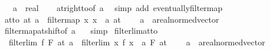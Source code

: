 \begin{isabellebody}
\ \ \ a\ {\isacharcolon}{\kern0pt}{\isacharcolon}{\kern0pt}\ real\isanewline
%
\isadelimproof
\ \ %
\endisadelimproof
%
\isatagproof
{}\isamarkupfalse%
\ at{\isacharunderscore}{\kern0pt}right{\isacharunderscore}{\kern0pt}to{\isacharunderscore}{\kern0pt}{}{\isacharbrackleft}{\kern0pt}of\ a{\isacharbrackright}{\kern0pt}\ \isamarkupfalse%
\ {\isacharparenleft}{\kern0pt}simp\ add{\isacharcolon}{\kern0pt}\ eventually{\isacharunderscore}{\kern0pt}filtermap{\isacharparenright}{\kern0pt}%
\endisatagproof
{\isafoldproof}%
%
\isadelimproof
\isanewline
%
\endisadelimproof
\isanewline
{}\isamarkupfalse%
\ at{\isacharunderscore}{\kern0pt}to{\isacharunderscore}{\kern0pt}{}{\isacharcolon}{\kern0pt}\ {\isachardoublequoteopen}at\ a\ {\isacharequal}{\kern0pt}\ filtermap\ {\isacharparenleft}{\kern0pt}{\isasymlambda}x{\isachardot}{\kern0pt}\ x\ {\isacharplus}{\kern0pt}\ a{\isacharparenright}{\kern0pt}\ {\isacharparenleft}{\kern0pt}at\ {}{\isacharparenright}{\kern0pt}{\isachardoublequoteclose}\isanewline
\ \ \ a\ {\isacharcolon}{\kern0pt}{\isacharcolon}{\kern0pt}\ {\isachardoublequoteopen}{\isacharprime}{\kern0pt}a{\isacharcolon}{\kern0pt}{\isacharcolon}{\kern0pt}real{\isacharunderscore}{\kern0pt}normed{\isacharunderscore}{\kern0pt}vector{\isachardoublequoteclose}\isanewline
%
\isadelimproof
\ \ %
\endisadelimproof
%
\isatagproof
{}\isamarkupfalse%
\ filtermap{\isacharunderscore}{\kern0pt}at{\isacharunderscore}{\kern0pt}shift{\isacharbrackleft}{\kern0pt}of\ {\isachardoublequoteopen}{\isacharminus}{\kern0pt}a{\isachardoublequoteclose}\ {}{\isacharbrackright}{\kern0pt}\ \isamarkupfalse%
\ simp%
\endisatagproof
{\isafoldproof}%
%
\isadelimproof
\isanewline
%
\endisadelimproof
\isanewline
{}\isamarkupfalse%
\ filterlim{\isacharunderscore}{\kern0pt}at{\isacharunderscore}{\kern0pt}to{\isacharunderscore}{\kern0pt}{}{\isacharcolon}{\kern0pt}\isanewline
\ \ {\isachardoublequoteopen}filterlim\ f\ F\ {\isacharparenleft}{\kern0pt}at\ a{\isacharparenright}{\kern0pt}\ {\isasymlongleftrightarrow}\ filterlim\ {\isacharparenleft}{\kern0pt}{\isasymlambda}x{\isachardot}{\kern0pt}\ f\ {\isacharparenleft}{\kern0pt}x\ {\isacharplus}{\kern0pt}\ a{\isacharparenright}{\kern0pt}{\isacharparenright}{\kern0pt}\ F\ {\isacharparenleft}{\kern0pt}at\ {}{\isacharparenright}{\kern0pt}{\isachardoublequoteclose}\isanewline
\ \ \ a\ {\isacharcolon}{\kern0pt}{\isacharcolon}{\kern0pt}\ {\isachardoublequoteopen}{\isacharprime}{\kern0pt}a{\isacharcolon}{\kern0pt}{\isacharcolon}{\kern0pt}real{\isacharunderscore}{\kern0pt}normed{\isacharunderscore}{\kern0pt}vector{\isachardoublequoteclose}\isanewline

\end{isabellebody}
